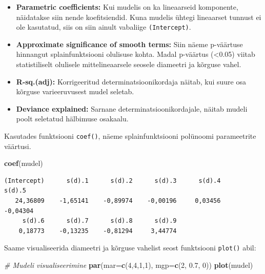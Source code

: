 \documentclass[
]{book}
\newenvironment{Shaded}{\begin{snugshade}}{\end{snugshade}}
\newcommand{\AttributeTok}[1]{\textcolor[rgb]{0.13,0.29,0.53}{#1}}
\newcommand{\CommentTok}[1]{\textcolor[rgb]{0.56,0.35,0.01}{\textit{#1}}}
\newcommand{\DecValTok}[1]{\textcolor[rgb]{0.00,0.00,0.81}{#1}}
\newcommand{\FloatTok}[1]{\textcolor[rgb]{0.00,0.00,0.81}{#1}}
\newcommand{\FunctionTok}[1]{\textcolor[rgb]{0.13,0.29,0.53}{\textbf{#1}}}
\newcommand{\NormalTok}[1]{#1}
\providecommand{\tightlist}{%
  \setlength{\itemsep}{0pt}\setlength{\parskip}{0pt}}
\renewenvironment{Shaded} {\begin{snugshade}\footnotesize} {\end{snugshade}}
\begin{document}
\begin{itemize}
\tightlist
\item
  \textbf{Parametric coefficients:} Kui mudelis on ka lineaarseid komponente, näidatakse siin nende koefitsiendid. Kuna mudelis ühtegi lineaarset tunnust ei ole kasutatud, siis on siin ainult vabaliige \texttt{(Intercept)}.
\item
  \textbf{Approximate significance of smooth terms:} Siin näeme p-väärtuse hinnangut splainfunktsiooni olulisuse kohta. Madal p-väärtus (\textless0.05) viitab statistiliselt olulisele mittelineaarsele seosele diameetri ja kõrguse vahel.
\item
  \textbf{R-sq.(adj):} Korrigeeritud determinatsioonikordaja näitab, kui suure osa kõrguse varieeruvusest mudel seletab.
\item
  \textbf{Deviance explained:} Sarnane determinatsioonikordajale, näitab mudeli poolt seletatud hälbimuse osakaalu.
\end{itemize}

Kasutades funktsiooni \texttt{coef()}, näeme splainfunktsiooni polünoomi parameetrite väärtusi.

\begin{Shaded}
\begin{Highlighting}[]
\FunctionTok{coef}\NormalTok{(mudel)}
\end{Highlighting}
\end{Shaded}

\begin{verbatim}
(Intercept)      s(d).1      s(d).2      s(d).3      s(d).4      s(d).5 
   24,36809    -1,65141    -0,89974    -0,00196     0,03456    -0,04304 
     s(d).6      s(d).7      s(d).8      s(d).9 
    0,18773    -0,13235    -0,81294     3,44774 
\end{verbatim}

Saame visualiseerida diameetri ja kõrguse vahelist seost funktsiooni \texttt{plot()} abil:

\begin{Shaded}
\begin{Highlighting}[]
\CommentTok{\# Mudeli visualiseerimine}
\FunctionTok{par}\NormalTok{(}\AttributeTok{mar=}\FunctionTok{c}\NormalTok{(}\DecValTok{4}\NormalTok{,}\DecValTok{4}\NormalTok{,}\DecValTok{1}\NormalTok{,}\DecValTok{1}\NormalTok{), }\AttributeTok{mgp=}\FunctionTok{c}\NormalTok{(}\DecValTok{2}\NormalTok{, }\FloatTok{0.7}\NormalTok{, }\DecValTok{0}\NormalTok{))}
\FunctionTok{plot}\NormalTok{(mudel)}
\end{Highlighting}
\end{Shaded}
\end{document}
